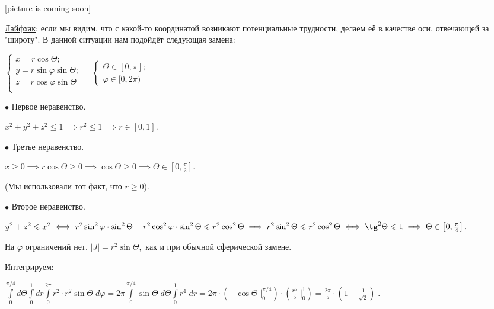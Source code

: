 \documentclass[a4paper, fleqn]{article}
\begin{document}
    [picture is coming soon]
    
    \underline{Лайфхак}: если мы видим, что с какой-то координатой возникают потенциальные трудности, делаем её в качестве оси, отвечающей за "широту". В данной ситуации нам подойдёт следующая замена:
    
    $\begin{cases}
    x = r \cos \Theta;\\
    y = r \sin  \varphi \sin  \Theta;\\
    z = r \cos  \varphi \sin  \Theta \\
    \end{cases} \; \; \; \; 
    \begin{cases}
    \Theta \in [0,\pi];\\
    \varphi \in [0, 2 \pi)
    \end{cases}$
    
    $\bullet$ Первое неравенство.
    
    $x^2 + y^2 + z^2 \leq 1 \implies r^2 \leq 1 \implies r \in [0,1].$
    
    $\bullet$ Третье неравенство.
    
    $x \geq 0 \implies r \cos \Theta \geq 0 \implies \cos \Theta \geq 0 \implies \Theta \in \left[0, \frac{\pi}{2}\right]. $
    
    (Мы использовали тот факт, что $r \geq 0$).
    
    $\bullet$ Второе неравенство.
    
    $y^2 + z^2 \leq x^2 \iff
    r^2 \sin^2  \varphi \cdot \sin^2  \Theta +
    r^2 \cos^2  \varphi \cdot  \sin^2  \Theta \leq 
    r^2 \cos^2 \Theta \implies r^2 \sin^2 \Theta \leq r^2 \cos^2 \Theta \iff \tg^2 \Theta \leq 1 \implies \Theta \in \left[ 0, \frac{\pi}{4} \right].$
    
    На $\varphi$ ограничений нет. $|J| = r^2 \sin \Theta,$ как и при обычной сферической замене.
    
    Интегрируем:
    
    $\displaystyle \int \limits_{0}^{\pi /4} d\Theta  \int \limits_{0}^{1} dr  \int \limits_{0}^{2 \pi}   r^2 \cdot r^2 \sin \Theta \; d \varphi  = 2 \pi \int \limits_{0}^{\pi /4} \sin \Theta \;  d\Theta  \int \limits_{0}^{1}  r^4   \; dr = 2 \pi \cdot  \left( -\cos \Theta \;  \Bigg|_{0}^{\pi /4} \right) \cdot \left( \frac{r^5}{5} \; \Bigg|_0^1 \right) = \boxed{\frac{2\pi}{5} \cdot \left(1 - \frac{1}{\sqrt{2}} \right)} \; .$
    
    
    
    
    
\end{document}

